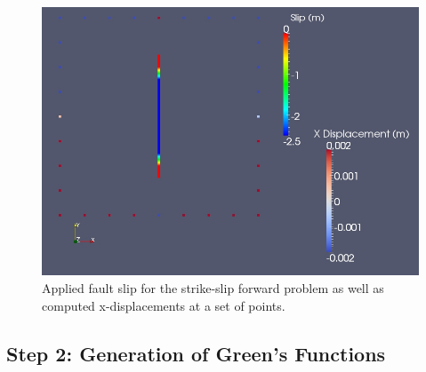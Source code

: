 \noindent \begin{center}
\begin{figure}
\begin{centering}
\includegraphics[scale=0.33]{tutorials/greensfns2d/figs/strikeslip_forward_points}
\par\end{centering}

\caption{Applied fault slip for the strike-slip forward problem as well as
computed x-displacements at a set of points.\label{fig:greensfns2d-strikeslip-forward}}
\end{figure}

\par\end{center}


\subsection{Step 2: Generation of Green's Functions}

